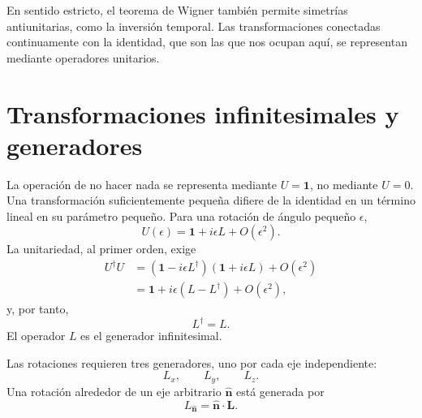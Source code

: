 En sentido estricto, el teorema de Wigner también permite simetrías antiunitarias, como la inversión temporal. Las transformaciones conectadas continuamente con la identidad, que son las que nos ocupan aquí, se representan mediante operadores unitarios. 

\section{Transformaciones infinitesimales y generadores}

La operación de no hacer nada se representa mediante \(U=\mathbf 1\), no mediante \(U=0\). Una transformación suficientemente pequeña difiere de la identidad en un término lineal en su parámetro pequeño. Para una rotación de ángulo pequeño \(\epsilon\),
\begin{equation}
U(\epsilon)=\mathbf 1+i\epsilon L+O(\epsilon^2).
\end{equation}
La unitariedad, al primer orden, exige
\begin{align}
U^\dagger U
&=\left(\mathbf 1-i\epsilon L^\dagger\right)
  \left(\mathbf 1+i\epsilon L\right)+O(\epsilon^2)\\
&=\mathbf 1+i\epsilon(L-L^\dagger)+O(\epsilon^2),
\end{align}
y, por tanto,
\begin{equation}
L^\dagger=L.
\end{equation}
El operador \(L\) es el generador infinitesimal.

Las rotaciones requieren tres generadores, uno por cada eje independiente:
\begin{equation}
L_x,\qquad L_y,\qquad L_z.
\end{equation}
Una rotación alrededor de un eje arbitrario \(\widehat{\bm n}\) está generada por
\begin{equation}
L_{\widehat{\bm n}}=\widehat{\bm n}\cdot\bm L.
\end{equation}

\begin{classroomqa}
\end{classroomqa}


